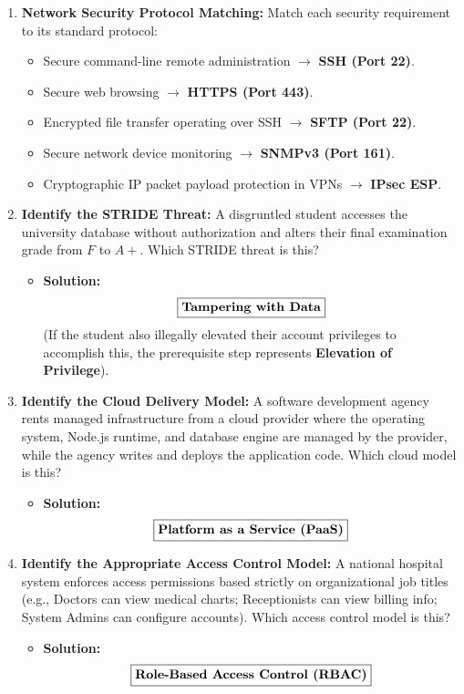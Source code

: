 \begin{enumerate}[label=\textbf{Problem \arabic*.,resume},leftmargin=1.5cm]
\item \textbf{Network Security Protocol Matching:}
Match each security requirement to its standard protocol:
\begin{itemize}
\item Secure command-line remote administration $\to$ \textbf{SSH (Port 22)}.
\item Secure web browsing $\to$ \textbf{HTTPS (Port 443)}.
\item Encrypted file transfer operating over SSH $\to$ \textbf{SFTP (Port 22)}.
\item Secure network device monitoring $\to$ \textbf{SNMPv3 (Port 161)}.
\item Cryptographic IP packet payload protection in VPNs $\to$ \textbf{IPsec ESP}.
\end{itemize}

\item \textbf{Identify the STRIDE Threat:}
A disgruntled student accesses the university database without authorization and alters their final examination grade from $F$ to $A+$. Which STRIDE threat is this?
\begin{itemize}
\item \textbf{Solution:}
\[ \boxed{\text{\textbf{Tampering with Data}}} \]
(If the student also illegally elevated their account privileges to accomplish this, the prerequisite step represents \textbf{Elevation of Privilege}).
\end{itemize}

\item \textbf{Identify the Cloud Delivery Model:}
A software development agency rents managed infrastructure from a cloud provider where the operating system, Node.js runtime, and database engine are managed by the provider, while the agency writes and deploys the application code. Which cloud model is this?
\begin{itemize}
\item \textbf{Solution:}
\[ \boxed{\text{\textbf{Platform as a Service (PaaS)}}} \]
\end{itemize}

\item \textbf{Identify the Appropriate Access Control Model:}
A national hospital system enforces access permissions based strictly on organizational job titles (e.g., Doctors can view medical charts; Receptionists can view billing info; System Admins can configure accounts). Which access control model is this?
\begin{itemize}
\item \textbf{Solution:}
\[ \boxed{\text{\textbf{Role-Based Access Control (RBAC)}}} \]
\end{itemize}


\end{enumerate}
